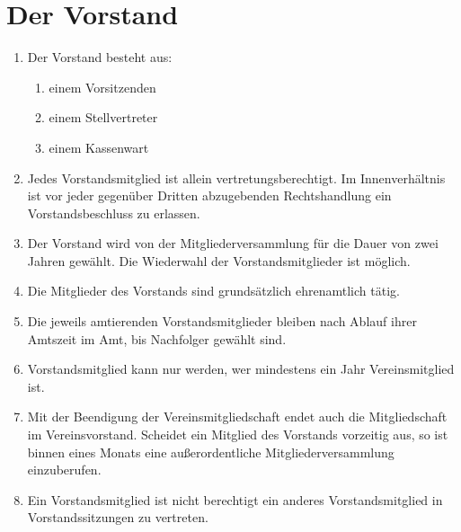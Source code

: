 \documentclass[a4paper,ngerman]{scrartcl}
\begin{document}
\section{Der Vorstand}
\begin{enumerate}
\item Der Vorstand besteht aus:
\begin{enumerate}
\item einem Vorsitzenden
\item einem Stellvertreter
\item einem Kassenwart
\end{enumerate}
\item Jedes Vorstandsmitglied ist allein vertretungsberechtigt. Im Innenverhältnis ist vor jeder gegenüber Dritten abzugebenden Rechtshandlung ein Vorstandsbeschluss zu erlassen.
\item Der Vorstand wird von der Mitgliederversammlung für die Dauer von zwei Jahren gewählt. Die Wiederwahl der Vorstandsmitglieder ist möglich.
\item Die Mitglieder des Vorstands sind grundsätzlich ehrenamtlich tätig.
\item Die jeweils amtierenden Vorstandsmitglieder bleiben nach Ablauf ihrer Amtszeit im Amt, bis Nachfolger gewählt sind.
\item Vorstandsmitglied kann nur werden, wer mindestens ein Jahr Vereinsmitglied ist.
\item Mit der Beendigung der Vereinsmitgliedschaft endet auch die Mitgliedschaft im Vereinsvorstand. Scheidet ein Mitglied des Vorstands vorzeitig aus, so ist binnen eines
Monats eine außerordentliche Mitgliederversammlung einzuberufen.
\item Ein Vorstandsmitglied ist nicht berechtigt ein anderes Vorstandsmitglied in Vorstandssitzungen zu vertreten.
\end{enumerate}
\end{document}
